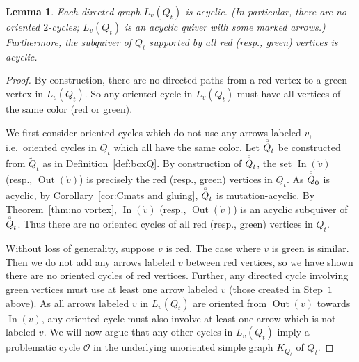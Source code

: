 \documentclass[11pt, letterpaper]{amsart}
\newtheorem{lemma}[theorem]{Lemma}
\theoremstyle{definition}
\numberwithin{equation}{section}
\def\In{{\operatorname{In}}}
\def\Out{{\operatorname{Out}}}
\newcommand{\boxQ}{\overset{\hspace*{0.4pt}\scalebox{0.4}{$\bm{\Box}$}}{Q}} %
\newcommand{\Qinit}{Q_0}
\newcommand{\Qtmut}{Q_t}
\newcommand{\Lgraph}{L}
\begin{document}
\begin{lemma}
\label{lem:Q tilde acyclic}
Each directed graph $\Lgraph_{v}(\Qtmut)$ is acyclic. (In particular, there are no oriented $2$-cycles; $\Lgraph_{v}(\Qtmut)$ is an acyclic quiver with some marked arrows.)
Furthermore, the subquiver of $\Qtmut$ supported by all red (resp., green) vertices is acyclic.
\end{lemma}


\begin{proof}
By construction, there are no directed paths from a red vertex to a green vertex in $\Lgraph_{v}(\Qtmut)$.
So any oriented cycle in $\Lgraph_v(\Qtmut)$ must have all vertices of the same color (red or green). 

We first consider oriented cycles which do not use any arrows labeled $v$, i.e.\ oriented cycles in $\Qtmut$ which all have the same color.
Let $\boxQ_t$ be constructed from $\tilde Q_t$ as in Definition~\ref{def:boxQ}. %
By construction of $\boxQ_t$, the set $\In(\mathring{v})$ (resp., $\Out(\mathring{v})$) is precisely the red (resp., green) vertices in $\Qtmut$.
As $\boxQ_0$ is acyclic, by Corollary~\ref{cor:Cmats and gluing}, $\boxQ_t$ is mutation-acyclic. %
By Theorem~\ref{thm:no vortex}, $\In(\mathring{v})$ (resp., $\Out(\mathring{v})$) is an acyclic subquiver of $\boxQ_t$.
Thus there are no oriented cycles of all red (resp., green) vertices in $\Qtmut$.

Without loss of generality, suppose $v$ is red. 
The case where $v$ is green is similar.
Then we do not add any arrows labeled $v$ between red %
vertices, so we have shown there are no oriented cycles of red %
vertices.
Further, any directed cycle involving green %
vertices must use at least one arrow labeled $v$ (those created in Step~$1$ above).
As all arrows labeled $v$ in $\Lgraph_{v}(\Qtmut)$ are oriented from $\Out(v)$ towards $\In(v)$, any oriented cycle must also involve at least one arrow which is not labeled $v$.
We will now argue that any other cycles in $\Lgraph_{v}(\Qtmut)$ imply a problematic cycle $\mathcal{O}$ in the underlying unoriented simple graph $K_{\Qtmut}$ of $\Qtmut$. 


\end{proof}
\end{document}

